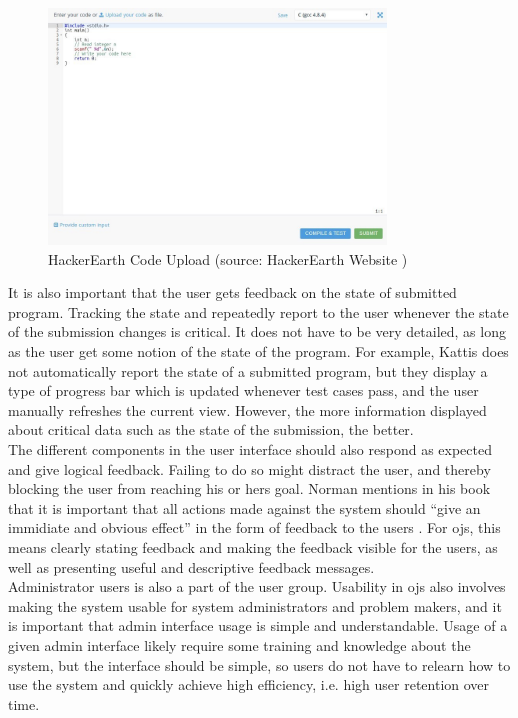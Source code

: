 \begin{figure}
    \centering
    \includegraphics[width=0.8\textwidth]{figs/hackerearth_upload.jpg}
    \caption[HackerEarth Code Upload]{HackerEarth Code Upload (source: HackerEarth Website \cite{HACKEREARTH})}
    \label{fig:hackerearth-upload}
\end{figure}

It is also important that the user gets feedback on the state of submitted program. Tracking the state and repeatedly report to the user whenever the state of the submission changes is critical. It does not have to be very detailed, as long as the user get some notion of the state of the program. For example, Kattis does not automatically report the state of a submitted program, but they display a type of progress bar which is updated whenever test cases pass, and the user manually refreshes the current view. However, the more information displayed about critical data such as the state of the submission, the better. \\

The different components in the user interface should also respond as expected and give logical feedback. Failing to do so might distract the user, and thereby blocking the user from reaching his or hers goal. Norman mentions in his book that it is important that all actions made against the system should ``give an immidiate and obvious effect'' in the form of feedback to the users \cite{norman1988design}. For \glspl{oj}, this means clearly stating feedback and making the feedback visible for the users, as well as presenting useful and descriptive feedback messages.\\

Administrator users is also a part of the user group. Usability in \glspl{oj} also involves making the system usable for system administrators and problem makers, and it is important that admin interface usage is simple and understandable. Usage of a given admin interface likely require some training and knowledge about the system, but the interface should be simple, so users do not have to relearn how to use the system and quickly achieve high efficiency, i.e. high user retention over time. \\

